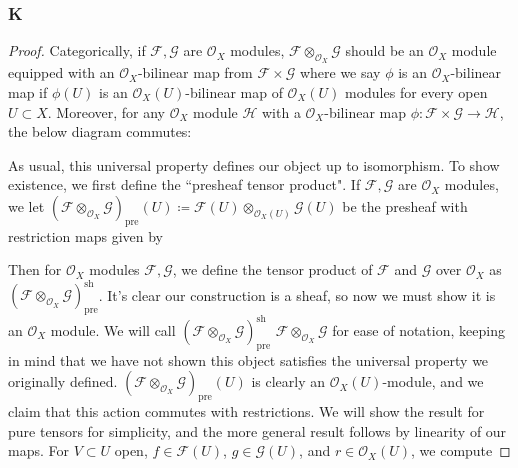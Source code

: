 \documentclass{article}
\newcommand{\fF}{\mathscr{F}}
\newcommand{\fG}{\mathscr{G}}
\newcommand{\fH}{\mathscr{H}}
\newcommand{\fO}{\mathscr{O}}
\DeclareMathOperator{\res}{\mathrm{res}}
\DeclareMathOperator{\pre}{\mathrm{pre}}
\DeclareMathOperator{\sh}{sh}
\begin{document}
\subsubsection{K}\label{2.6.K}
\begin{proof}
    Categorically, if $\fF, \fG$ are $\fO_X$ modules, $\fF \otimes_{\fO_X} \fG$ should be an $\fO_X$ module equipped with an $\fO_X$-bilinear map from $\fF\times \fG$ where we say $\phi$ is an $\fO_X$-bilinear map if $\phi(U)$ is an $\fO_X(U)$-bilinear map of $\fO_X(U)$ modules for every open $U\subset X$. Moreover, for any $\fO_X$ module $\fH$ with a $\fO_X$-bilinear map $\phi:\fF\times \fG \to \fH$, the below diagram commutes:
    \begin{center}
    \end{center}
    As usual, this universal property defines our object up to isomorphism. To show existence, we first define the ``presheaf tensor product". If $\fF, \fG$ are $\fO_X$ modules, we let $(\fF \otimes_{\fO_X} \fG)_{\pre}(U)\coloneqq \fF(U) \otimes_{\fO_X(U)} \fG(U)$ be the presheaf with restriction maps given by
    \begin{center}
    \end{center}
    Then for $\fO_X$ modules $\fF, \fG$, we define the tensor product of $\fF$ and $\fG$ over $\fO_X$ as $(\fF\otimes_{\fO_X} \fG)_{\pre}^{\sh}$. It's clear our construction is a sheaf, so now we must show it is an $\fO_X$ module. We will call $(\fF \otimes_{\fO_X} \fG)_{\pre}^{\sh}$ $\fF\otimes_{\fO_X} \fG$ for ease of notation, keeping in mind that we have not shown this object satisfies the universal property we originally defined. $(\fF \otimes_{\fO_X} \fG)_{\pre}(U)$ is clearly an $\fO_X(U)$-module\iffalse, and we claim that this action commutes with restrictions. We will show the result for pure tensors for simplicity, and the more general result follows by linearity of our maps. For $V\subset U$ open, $f\in \fF(U)$, $g\in \fG(U)$, and $r\in \fO_X(U)$, we compute

\end{proof}
\end{document}
